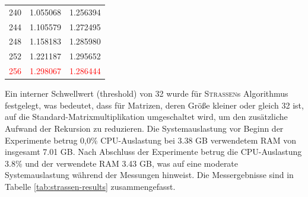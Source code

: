 \documentclass{scrartcl}
\numberwithin{equation}{section}
\begin{document}
\begin{table}[h!]
\begin{tabular}{c|m{3.3cm}|m{3.3cm}}
		240 & 1.055068 & 1.256394 \\ 
		244 & 1.105579 & 1.272495 \\ 
		248 & 1.158183 & 1.285980 \\ 
		252 & 1.221187 & 1.295652 \\ 
		\textcolor{red}{256} & \textcolor{red}{1.298067} & \textcolor{red}{1.286444} \\
		\hline
	\end{tabular}
\end{table}
Ein interner Schwellwert (threshold) von 32 wurde für \textsc{Strassen}s Algorithmus festgelegt, was bedeutet, dass für Matrizen, deren Größe kleiner oder gleich 32 ist, auf die Standard-Matrixmultiplikation umgeschaltet wird, um den zusätzliche Aufwand der Rekursion zu reduzieren. Die Systemauslastung vor Beginn der Experimente betrug 0,0\% CPU-Auslastung bei 3.38 GB verwendetem RAM von insgesamt 7.01 GB. Nach Abschluss der Experimente betrug die CPU-Auslastung 3.8\% und der verwendete RAM 3.43 GB, was auf eine moderate Systemauslastung während der Messungen hinweist. Die Messergebnisse sind in Tabelle \ref{tab:strassen-results} zusammengefasst.
\end{document}
